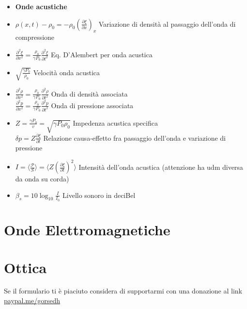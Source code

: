 \documentclass[a4paper]{article}
\begin{document}
\begin{itemize}
 	\item \textbf{Onde acustiche} 
 	\item $\rho(x,t)-\rho_0 =-\rho_0(\frac{\partial \xi}{\partial x})_x $ Variazione di densità al passaggio dell'onda di compressione
 	\item $\frac{\partial^2 \xi}{\partial x^2}=\frac{\rho_0}{\gamma P_0} \frac{\partial^2 \xi}{\partial t^2}$ Eq. D'Alembert per onda acustica
 	\item $\sqrt{\frac{\gamma P_0}{\rho_0}}$ Velocità onda acustica
 	\item $\frac{\partial^2 \rho}{\partial x^2}=\frac{\rho_0}{\gamma P_0} \frac{\partial^2 \rho}{\partial t^2}$ Onda di densità associata\\
 	$\frac{\partial^2 p}{\partial x^2}=\frac{\rho_0}{\gamma P_0} \frac{\partial^2 p}{\partial t^2}$ Onda di pressione associata
 	\item $Z=\frac{\gamma P_0}{v}=\sqrt{\gamma P_0 \rho_0}$ Impedenza acustica specifica\\
 	$\delta p=Z \frac{\partial \xi}{\partial t}$ Relazione causa-effetto fra passaggio dell'onda e variazione di pressione
 	\item $I=\langle\frac{\mathcal{P}}{S}\rangle=\langle Z(\frac{\partial \xi}{\partial t})^2\rangle$ Intensità dell'onda acustica (attenzione ha udm diversa da onda su corda)
 	\item $\beta_s =10\log_{10}\frac{I}{I_0}$ Livello sonoro in deciBel
 	
 	
 \end{itemize}	


\section{Onde Elettromagnetiche}
\section{Ottica}

Se il formulario ti è piaciuto considera di supportarmi con una donazione al link \href{paypal.me/gorsedh}{paypal.me/gorsedh}
\end{document}
